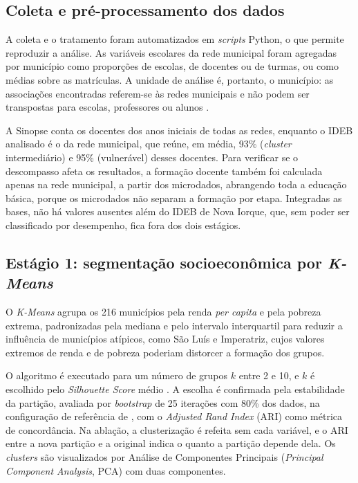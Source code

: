 \subsection{Coleta e pré-processamento dos dados}

A coleta e o tratamento foram automatizados em \textit{scripts} Python, o que permite reproduzir a análise. As variáveis escolares da rede municipal foram agregadas por município como proporções de escolas, de docentes ou de turmas, ou como médias sobre as matrículas. A unidade de análise é, portanto, o município: as associações encontradas referem-se às redes municipais e não podem ser transpostas para escolas, professores ou alunos \parencite{robinson1950}.

A Sinopse conta os docentes dos anos iniciais de todas as redes, enquanto o IDEB analisado é o da rede municipal, que reúne, em média, 93\% (\textit{cluster} intermediário) e 95\% (vulnerável) desses docentes. Para verificar se o descompasso afeta os resultados, a formação docente também foi calculada apenas na rede municipal, a partir dos microdados, abrangendo toda a educação básica, porque os microdados não separam a formação por etapa. Integradas as bases, não há valores ausentes além do IDEB de Nova Iorque, que, sem poder ser classificado por desempenho, fica fora dos dois estágios.

\subsection{Estágio 1: segmentação socioeconômica por \textit{K-Means}}

O \textit{K-Means} \parencite{macqueen1967} agrupa os 216 municípios pela renda \textit{per capita} e pela pobreza extrema, padronizadas pela mediana e pelo intervalo interquartil para reduzir a influência de municípios atípicos, como São Luís e Imperatriz, cujos valores extremos de renda e de pobreza poderiam distorcer a formação dos grupos.

O algoritmo é executado para um número de grupos $k$ entre 2 e 10, e $k$ é escolhido pelo \textit{Silhouette Score} médio \parencite{rousseeuw1987}. A escolha é confirmada pela estabilidade da partição, avaliada por \textit{bootstrap} de 25 iterações com 80\% dos dados, na configuração de referência de \textcite{benhur2002}, com o \textit{Adjusted Rand Index} (ARI) como métrica de concordância. Na ablação, a clusterização é refeita sem cada variável, e o ARI entre a nova partição e a original indica o quanto a partição depende dela. Os \textit{clusters} são visualizados por Análise de Componentes Principais (\textit{Principal Component Analysis}, PCA) \parencite{abdi2010} com duas componentes.

